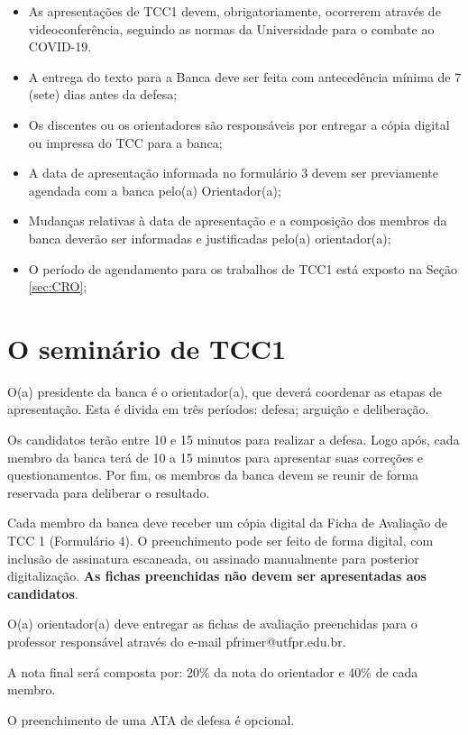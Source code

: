\documentclass[a4paper, 12pt]{article}
\begin{document}
    \begin{itemize}
    	\item As apresentações de TCC1 devem, obrigatoriamente, ocorrerem através de videoconferência, seguindo as normas da Universidade para o combate ao COVID-19.
    	\item A entrega do texto para a Banca deve ser feita com antecedência mínima de 7 (sete) dias antes da defesa;
    	\item Os discentes ou os orientadores são responsáveis por entregar a cópia digital ou impressa do TCC para a banca;
    	\item A data de apresentação informada no formulário 3 devem ser previamente agendada com a banca pelo(a) Orientador(a);
    	\item Mudanças relativas à data de apresentação e a composição dos membros da banca deverão ser informadas e justificadas pelo(a) orientador(a);
    	\item O período de agendamento para os trabalhos de TCC1 está exposto na Seção \ref{sec:CRO};
    \end{itemize}

	\section{O seminário de TCC1}
	
	O(a) presidente da banca é o orientador(a), que deverá coordenar as etapas de apresentação. Esta é divida em três períodos: defesa; arguição e deliberação. 
	
	Os candidatos terão entre 10 e 15 minutos para realizar a defesa. Logo após, cada membro da banca terá de 10 a 15 minutos para apresentar suas correções e questionamentos. Por fim, os membros da banca devem se reunir de forma reservada para deliberar o resultado.
	
	Cada membro da banca deve receber um cópia digital da Ficha de Avaliação de TCC 1 (Formulário 4). O preenchimento pode ser feito de forma digital, com inclusão de assinatura escaneada, ou assinado manualmente para posterior digitalização. \textbf{As fichas preenchidas não devem ser apresentadas aos candidatos}.
	
	O(a) orientador(a) deve entregar as fichas de avaliação preenchidas para o professor responsável através do e-mail pfrimer@utfpr.edu.br.
	
	A nota final será composta por: 20\% da nota do orientador e 40\% de cada membro.
	
	O preenchimento de uma ATA de defesa é opcional.
		
\end{document}
